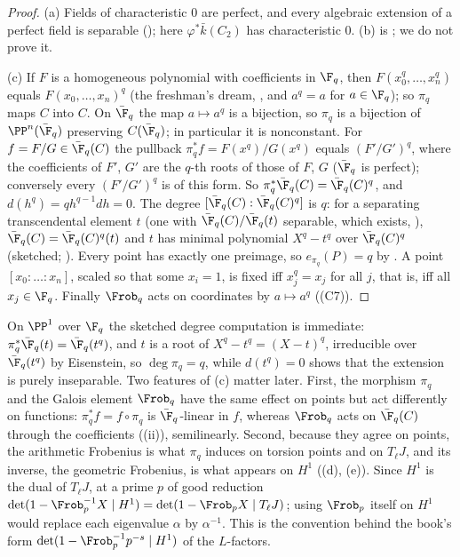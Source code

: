 \begin{proof}
(a) Fields of characteristic $0$ are perfect, and every algebraic extension of a perfect field is separable (); here
$\varphi^*\bar k(C_2)$ has characteristic $0$. (b) is \cite[Chapter II, Proposition 4.2(c) and Corollary 2.12]{SilvermanAEC}; we do not prove it.

(c) If $F$ is a homogeneous polynomial with coefficients in $\F_q$, then $F(x_0^q,\dots,x_n^q)$ equals $F(x_0,\dots,x_n)^q$ (the freshman's dream, ,
and $a^q=a$ for $a\in\F_q$); so $\pi_q$ maps $C$ into $C$. On $\bar\F_q$ the map $a\mapsto a^q$ is a bijection, so $\pi_q$ is a bijection of $\PP^n(\bar\F_q)$ preserving
$C(\bar\F_q)$; in particular it is nonconstant. For $f=F/G\in\bar\F_q(C)$ the pullback $\pi_q^*f=F(x^q)/G(x^q)$ equals $(F'/G')^q$, where the coefficients of $F'$, $G'$ are the $q$-th
roots of those of $F$, $G$ ($\bar\F_q$ is perfect); conversely every $(F'/G')^q$ is of this form. So $\pi_q^*\bar\F_q(C)=\bar\F_q(C)^q$, and $d(h^q)=qh^{q-1}dh=0$. The degree
$[\bar\F_q(C):\bar\F_q(C)^q]$ is $q$: for a separating transcendental element $t$ (one with $\bar\F_q(C)/\bar\F_q(t)$ separable, which exists, \cite[Chapter II,
Section 1]{SilvermanAEC}), $\bar\F_q(C)=\bar\F_q(C)^q(t)$ and $t$ has minimal polynomial $X^q-t^q$ over $\bar\F_q(C)^q$ (sketched; \cite[Chapter II, Proposition
2.11]{SilvermanAEC}). Every point has exactly one preimage, so $e_{\pi_q}(P)=q$ by . A point $[x_0:\dots:x_n]$, scaled so that some
$x_i=1$, is fixed iff $x_j^q=x_j$ for all $j$, that is, iff all $x_j\in\F_q$. Finally $\Frob_q$ acts on coordinates by $a\mapsto a^q$ ((C7)).
\end{proof}

On $\PP^1$ over $\F_q$ the sketched degree computation is immediate: $\pi_q^*\bar\F_q(t)=\bar\F_q(t^q)$, and $t$ is a root of $X^q-t^q=(X-t)^q$, irreducible over
$\bar\F_q(t^q)$ by Eisenstein, so $\deg\pi_q=q$, while $d(t^q)=0$ shows that the extension is purely inseparable. Two features of (c) matter later. First, the
morphism $\pi_q$ and the Galois element $\Frob_q$ have the same effect on points but act differently on functions: $\pi_q^*f=f\circ\pi_q$ is
$\bar\F_q$-linear in $f$, whereas $\Frob_q$ acts on $\bar\F_q(C)$ through the coefficients ((ii)), semilinearly. Second, because
they agree on points, the arithmetic Frobenius is what $\pi_q$ induces on torsion points and on $T_\ell J$, and its inverse, the geometric Frobenius, is what
appears on $H^1$ ((d), (e)). Since $H^1$ is the dual of $T_\ell J$, at a prime $p$ of good reduction
$\det(1-\Frob_p^{-1}X\mid H^1)=\det(1-\Frob_pX\mid T_\ell J)$; using $\Frob_p$ itself on $H^1$ would replace each eigenvalue $\alpha$ by $\alpha^{-1}$. This is
the convention behind the book's form $\det(1-\Frob_p^{-1}p^{-s}\mid H^1)$ of the $L$-factors.

